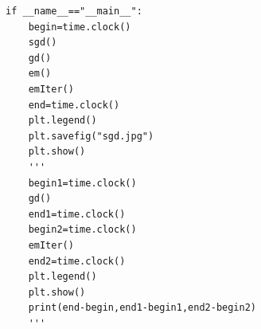 \documentclass{article}
\begin{document}
\begin{verbatim}
if __name__=="__main__":
    begin=time.clock()
    sgd()
    gd()
    em()
    emIter()
    end=time.clock()
    plt.legend()
    plt.savefig("sgd.jpg")
    plt.show()
    '''
    begin1=time.clock()
    gd()
    end1=time.clock()
    begin2=time.clock()
    emIter()
    end2=time.clock()
    plt.legend()
    plt.show()
    print(end-begin,end1-begin1,end2-begin2)
    '''


\end{verbatim}
\end{document}
